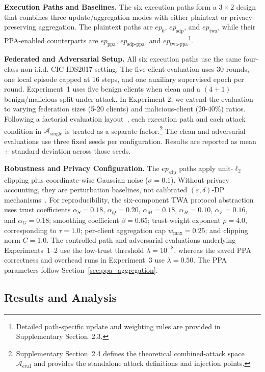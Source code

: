 \documentclass[journal]{IEEEtran}
\begin{document}
\textbf{Execution Paths and Baselines.}\label{sec:execution_paths}
The six execution paths form a $3\times2$ design that combines three
update/aggregation modes with either plaintext or
privacy-preserving aggregation. The plaintext paths are $ep_{0}$,
$ep_{\mathrm{sdp}}$, and $ep_{\mathrm{twa}}$, while their
PPA-enabled counterparts are $ep_{\mathrm{ppa}}$,
$ep_{\mathrm{sdp\text{-}ppa}}$, and
$ep_{\mathrm{twa\text{-}ppa}}$\footnote{Detailed path-specific update and weighting 
rules are provided in Supplementary Section~2.3.}.

\textbf{Federated and Adversarial Setup.}
All six execution paths use the same four-class non-i.i.d. CIC-IDS2017 setting.
The five-client evaluation uses 30 rounds, one local episode capped at
16 steps, and one auxiliary supervised epoch per round. Experiment~1 uses five
benign clients when clean and a $(4+1)$ benign/malicious split under attack.
In Experiment 2, we extend the evaluation to varying federation sizes (5-20 clients) 
and malicious-client (20-40\%) ratios. Following a factorial evaluation
layout~\cite{nist_two_way_anova}, each execution path and each attack condition in
$\mathcal{A}_{\mathrm{single}}$ is treated as a separate factor.\footnote{Supplementary 
Section~2.4 defines the theoretical combined-attack space $\mathcal{A}_{\mathrm{eval}}$ 
and provides the standalone attack definitions and injection points.}
The clean and adversarial evaluations use three fixed seeds per configuration.
Results are reported as mean $\pm$ standard deviation across those seeds.


\textbf{Robustness and Privacy Configuration.}
The $ep_{\mathrm{sdp}}$ paths apply unit-$\ell_2$ clipping plus coordinate-wise
Gaussian noise ($\sigma=0.1$). Without privacy accounting, they are perturbation
baselines, not calibrated $(\varepsilon,\delta)$-DP
mechanisms~\cite{dwork2006dp,abadi2016dpdl}. For
reproducibility, the six-component TWA protocol abstraction uses trust coefficients
$\alpha_S=0.18$, $\alpha_Q=0.20$,
$\alpha_M=0.18$, $\alpha_H=0.10$, $\alpha_F=0.16$, and
$\alpha_G=0.18$; smoothing coefficient $\beta=0.65$; trust-weight exponent
$\rho=4.0$, corresponding to $\tau=1.0$; per-client aggregation cap
$w_{\max}=0.25$; and clipping norm $C=1.0$. The controlled path and
adversarial evaluations underlying Experiments~1--2 use the low-trust threshold
$\lambda=10^{-8}$, whereas the saved PPA correctness and overhead runs in
Experiment~3 use $\lambda=0.50$. The PPA parameters follow
Section~\ref{sec:ppa_aggregation}.


\subsection{Results and Analysis}\label{sec:results}
\end{document}
